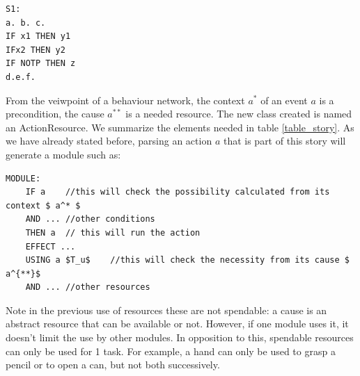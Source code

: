 \documentclass[
		twoside,openright,titlepage,numbers=noenddot,manychapters,
		headinclude,%
                footinclude=false,cleardoublepage=empty,
                BCOR=5mm,
		fontsize=11pt, %
                 enabledeprecatedfontcommands]{scrreprt}
\begin{document}
\begin{lstlisting}
S1:
a. b. c. 
IF x1 THEN y1
IFx2 THEN y2
IF NOTP THEN z
d.e.f.
\end{lstlisting}


From the veiwpoint of a behaviour network, the context $a^*$ of an event $a$ is a precondition, the cause $a^{**}$ is a needed resource. The new class created is named an ActionResource. We summarize the elements needed in table \ref{table_story}.  
As we have already stated before, parsing an action $a$ that is part of this story will generate a module such as:
\begin{lstlisting}[mathescape]
MODULE:
	IF a 	//this will check the possibility calculated from its context $ a^* $
	AND ...	//other conditions
	THEN a 	// this will run the action
	EFFECT ...
	USING a $T_u$	 //this will check the necessity from its cause $ a^{**}$ 
	AND	...	//other resources
\end{lstlisting}

Note in the previous use of resources these are not spendable: a cause is an abstract resource that can be available or not. However, if one module uses it, it doesn't limit the use by other modules. In opposition to this, spendable resources can only be used for 1 task. For example, a hand can only be used to grasp a pencil or to open a can, but not both successively.
\end{document}
